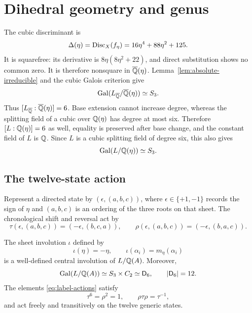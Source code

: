 \section{Dihedral geometry and genus}\label{sec:geometry}

The cubic discriminant is
\begin{equation}\label{eq:delta-eta}
 \Delta(\eta)=\operatorname{Disc}_X(f_\eta)
 =16\eta^4+88\eta^2+125.
\end{equation}
It is squarefree: its derivative is $8\eta(8\eta^2+22)$, and direct
substitution shows no common zero.  It is therefore nonsquare in
$\overline{\mathbb Q}(\eta)$.  Lemma~\ref{lem:absolute-irreducible} and the cubic Galois
criterion give
\begin{equation}\label{eq:s3-geometric}
 \operatorname{Gal}(L_{\overline{\mathbb Q}}/\overline{\mathbb Q}(\eta))\simeq S_3.
\end{equation}
Thus $[L_{\overline{\mathbb Q}}:\overline{\mathbb Q}(\eta)]=6$.  Base extension cannot increase degree,
whereas the splitting field of a cubic over $\mathbb Q(\eta)$ has degree at most
six.  Therefore $[L:\mathbb Q(\eta)]=6$ as well, equality is preserved after base
change, and the constant field of $L$ is $\mathbb Q$.
Since $L$ is a cubic splitting field of degree six, this also gives
\begin{equation}\label{eq:s3-arithmetic}
 \operatorname{Gal}(L/\mathbb Q(\eta))\simeq S_3.
\end{equation}

\subsection{The twelve-state action}

Represent a directed state by $(\epsilon,(a,b,c))$, where
$\epsilon\in\{+1,-1\}$ records the sign of $\eta$ and $(a,b,c)$ is an
ordering of the three roots on that sheet.  The chronological shift and
reversal act by
\begin{equation}\label{eq:label-actions}
 \tau(\epsilon,(a,b,c))=(-\epsilon,(b,c,a)),
 \qquad
 \rho(\epsilon,(a,b,c))=(-\epsilon,(b,a,c)).
\end{equation}

\begin{theorem}\label{thm:dihedral}
The sheet involution $\iota$ defined by
\[
 \iota(\eta)=-\eta,\qquad
 \iota(\alpha_i)=m_\eta(\alpha_i)
\]
is a well-defined central involution of $L/\mathbb Q(A)$.  Moreover,
\begin{equation}\label{eq:d6-group}
 \operatorname{Gal}(L/\mathbb Q(A))\simeq S_3\times C_2\simeq\mathsf D_6,
 \qquad |\mathsf D_6|=12.
\end{equation}
The elements \eqref{eq:label-actions} satisfy
\begin{equation}\label{eq:d6-relations}
 \tau^6=\rho^2=1,
 \qquad
 \rho\tau\rho=\tau^{-1},
\end{equation}
and act freely and transitively on the twelve generic states.
\end{theorem}

